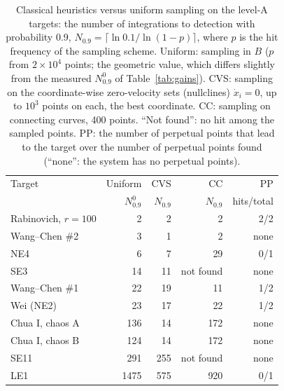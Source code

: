 
\begin{table}[tbhp]
\centering
\caption{Classical heuristics versus uniform sampling on the level-A targets: the number of integrations to detection with probability 0.9, $N_{0.9}=\lceil\ln0.1/\ln(1-p)\rceil$, where $p$ is the hit frequency of the sampling scheme. Uniform: sampling in $B$ ($p$ from $2\times10^4$ points; the geometric value, which differs slightly from the measured $N^0_{0.9}$ of Table~\ref{tab:gains}). CVS: sampling on the coordinate-wise zero-velocity sets (nullclines) $\dot x_i=0$, up to $10^3$ points on each, the best coordinate. CC: sampling on connecting curves, 400 points. ``Not found'': no hit among the sampled points. PP: the number of perpetual points that lead to the target over the number of perpetual points found (``none'': the system has no perpetual points).}
\label{tab:classic}
\scriptsize
\setlength{\tabcolsep}{3pt}

\begin{tabular}{lrrrr}
\toprule
Target & Uniform & CVS & CC & PP \\
 & $N^0_{0.9}$ & $N_{0.9}$ & $N_{0.9}$ & hits/total \\
\midrule
Rabinovich, $r=100$ & 2 & 2 & 2 & 2/2 \\
Wang--Chen \#2 & 3 & 1 & 2 & none \\
NE4 & 6 & 7 & 29 & 0/1 \\
SE3 & 14 & 11 & not found & none \\
Wang--Chen \#1 & 22 & 19 & 11 & 1/2 \\
Wei (NE2) & 23 & 17 & 22 & 1/2 \\
Chua I, chaos A\footnotemark[1] & 136 & 14 & 172 & none \\
Chua I, chaos B\footnotemark[1] & 124 & 14 & 172 & none \\
SE11 & 291 & 255 & not found & none \\
LE1 & 1475 & 575 & 920 & 0/1 \\
\bottomrule
\end{tabular}

\end{table}
